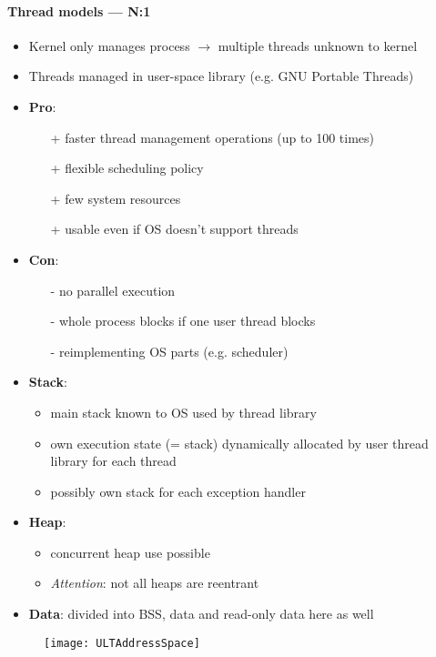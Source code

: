 \paragraph{Thread models --- N:1}
\begin{itemize}
  \item Kernel only manages process \( \to \) multiple threads unknown to kernel 
  \item Threads managed in user-space library (e.g. GNU Portable Threads)
  \item \textbf{Pro}:
  \begin{itemize}
    \item[+] faster thread management operations (up to 100 times)
    \item[+] flexible scheduling policy
    \item[+] few system resources
    \item[+] usable even if OS doesn't support threads
  \end{itemize}
  \item \textbf{Con}:
  \begin{itemize}
    \item[-] no parallel execution
    \item[-] whole process blocks if one user thread blocks
    \item[-] reimplementing OS parts (e.g. scheduler)
  \end{itemize}
  \item \textbf{Stack}:
  \begin{itemize}
    \item main stack known to OS used by thread library
    \item own execution state (= stack) dynamically allocated by user thread library for each thread
    \item possibly own stack for each exception handler
  \end{itemize}
  \item \textbf{Heap}:
  \begin{itemize}
    \item concurrent heap use possible
    \item \emph{Attention}: not all heaps are reentrant
  \end{itemize}
  \item \textbf{Data}: divided into BSS, data and read-only data here as well
\end{itemize}
\begin{figure}[h]\centering\label{ULTAddressSpace}\texttt{[image: ULTAddressSpace]}\end{figure}

